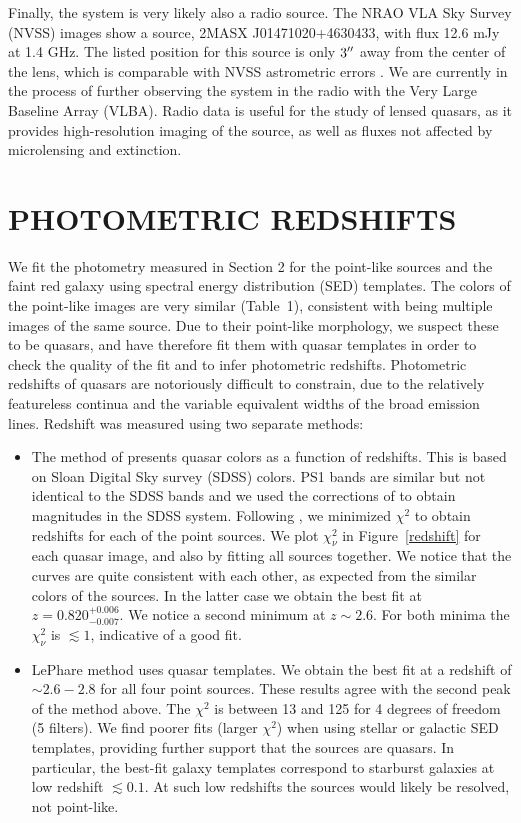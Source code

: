 \documentclass[manuscript]{aastex}
\begin{document}
Finally, the system is very likely also a radio source. The NRAO VLA Sky Survey (NVSS) images show a source, 2MASX J01471020+4630433, with flux 12.6 mJy at 1.4 GHz. The listed position for this source is only $3\mbox{$^{\prime\prime}$}$ away from the center of the lens, which is comparable with NVSS astrometric errors \citep{con98}. We are currently in the process of further observing the system in the radio with the Very Large Baseline Array (VLBA). Radio data is useful for the study of lensed quasars, as it provides high-resolution imaging of the source, as well as fluxes not affected by microlensing and extinction.

\section{PHOTOMETRIC REDSHIFTS}

We fit the photometry measured in Section 2 for the point-like sources and the faint red galaxy using spectral energy distribution (SED) templates. The colors of the point-like images are very similar (Table~1), consistent with being multiple images of the same source. Due to their point-like morphology, we suspect these to be quasars, and have therefore fit them with quasar templates in order to check the quality of the fit and to infer photometric redshifts. Photometric redshifts of quasars are notoriously difficult to constrain, due to the relatively featureless continua \citep{ric09} and the variable equivalent widths of the broad emission lines. Redshift was measured using two separate methods:
\begin{itemize}
\item The method of \citet{wu10} presents quasar colors as a function of redshifts. This is based on Sloan Digital Sky survey (SDSS) colors. PS1 bands are similar but not identical to the SDSS bands and we used the corrections of \citet{fin16} to obtain magnitudes in the SDSS system. Following \citet{wu10}, we minimized ${\chi}^2$ to obtain redshifts for each of the point sources. We plot $\chi^2_{\nu}$ in Figure~\ref{redshift} for each quasar image, and also by fitting all sources together. We notice that the curves are quite consistent with each other, as expected from the similar colors of the sources. In the latter case we obtain the best fit at $z = 0.820^{+0.006}_{-0.007}$. We notice a second minimum at $z \sim2.6$. For both minima the $\chi^2_{\nu}$ is $\lesssim1$, indicative of a good fit. 
\item LePhare \citep{arn99,ilb06} method uses quasar templates. We obtain the best fit at a redshift of $\sim 2.6-2.8$ for all four point sources.  These results agree with the second peak of the method above. The $\chi^2$ is between 13 and 125 for 4 degrees of freedom (5 filters). We find poorer fits (larger $\chi^2$) when using stellar or galactic SED templates, providing further support that the sources are quasars. In particular, the best-fit galaxy templates correspond to starburst galaxies at low redshift $\lesssim0.1$. At such low redshifts the sources would likely be resolved, not point-like. 
\end{itemize}
\end{document}
